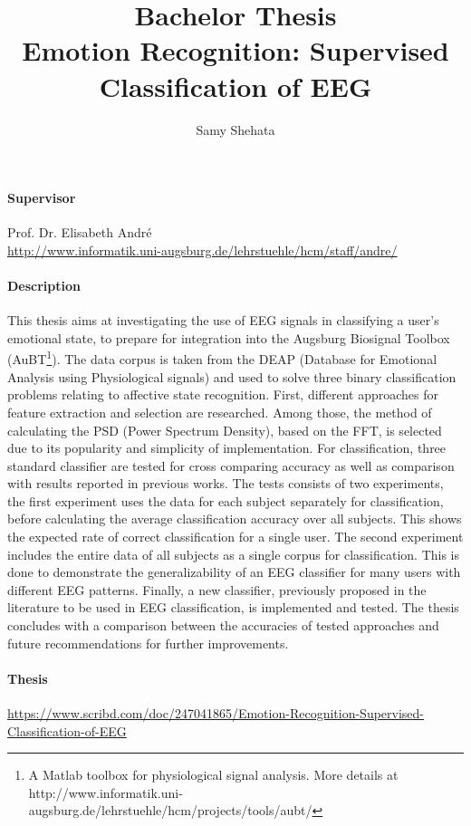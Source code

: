 \documentclass{article}
\title{Bachelor Thesis \\
Emotion Recognition: Supervised Classification of EEG}
\author{Samy Shehata}
\begin{document}
\maketitle

\paragraph{\textbf{Supervisor} \\}

Prof. Dr. Elisabeth Andr\'{e}\\
\href{http://www.informatik.uni-augsburg.de/lehrstuehle/hcm/staff/andre/}
{http://www.informatik.uni-augsburg.de/lehrstuehle/hcm/staff/andre/} \\

\paragraph{\textbf{Description} \\}
This thesis aims at investigating the use of EEG signals in classifying a user's emotional state, to prepare for integration into the Augsburg Biosignal Toolbox (AuBT\footnote{A Matlab toolbox for physiological signal analysis. More details at http://www.informatik.uni-augsburg.de/lehrstuehle/hcm/projects/tools/aubt/}). The data corpus is taken from the DEAP (Database for Emotional Analysis using Physiological signals) and used to solve three binary classification problems relating to affective state recognition. First, different approaches for feature extraction and selection are researched. Among those, the method of calculating the PSD (Power Spectrum Density), based on the FFT,  is selected due to its popularity and simplicity of implementation. For classification, three standard classifier are tested for cross comparing accuracy as well as comparison with results reported in previous works. The tests consists of two experiments, the first experiment uses the data for each subject separately for classification, before calculating the average classification accuracy over all subjects. This shows the expected rate of correct classification for a single user. The second experiment includes the entire data of all subjects as a single corpus for classification. This is done to demonstrate the generalizability of an EEG classifier for many users with different EEG patterns. Finally, a new classifier, previously proposed in the literature to be used in EEG classification, is implemented and tested. The thesis concludes with a comparison between the accuracies of tested approaches and future recommendations for further improvements. 

\paragraph{\textbf{Thesis} \\}
\href{https://www.scribd.com/doc/247041865/Emotion-Recognition-Supervised-Classification-of-EEG}
{https://www.scribd.com/doc/247041865/Emotion-Recognition-Supervised-Classification-of-EEG}
\end{document}
